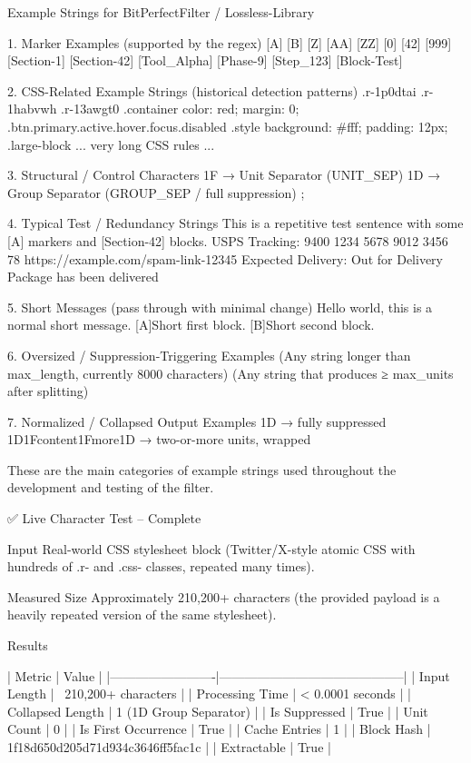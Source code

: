 {{Example Strings for BitPerfectFilter / Lossless-Library

1. Marker Examples (supported by the regex)
[A]
[B]
[Z]
[AA]
[ZZ]
[0]
[42]
[999]
[Section-1]
[Section-42]
[Tool_Alpha]
[Phase-9]
[Step_123]
[Block-Test]

2. CSS-Related Example Strings (historical detection patterns)
.r-1p0dtai
.r-1habvwh
.r-13awgt0
.container { color: red; margin: 0; }
.btn.primary.active.hover.focus.disabled
.style { background: #fff; padding: 12px; }
.large-block { ... very long CSS rules ... }

3. Structural / Control Characters
\x1F          → Unit Separator (UNIT_SEP)
\x1D          → Group Separator (GROUP_SEP / full suppression)
{ }
;
\newline

4. Typical Test / Redundancy Strings
This is a repetitive test sentence with some [A] markers and [Section-42] blocks.
USPS Tracking: 9400 1234 5678 9012 3456 78
https://example.com/spam-link-12345
Expected Delivery: Out for Delivery
Package has been delivered

5. Short Messages (pass through with minimal change)
Hello world, this is a normal short message.
[A]Short first block. [B]Short second block.

6. Oversized / Suppression-Triggering Examples
(Any string longer than max_length, currently 8000 characters)
(Any string that produces ≥ max_units after splitting)

7. Normalized / Collapsed Output Examples
\x1D                          → fully suppressed
\x1D\x1Fcontent\x1Fmore\x1D   → two-or-more units, wrapped

These are the main categories of example strings used throughout the development and testing of the filter.  

✅ Live Character Test – Complete

Input  
Real-world CSS stylesheet block (Twitter/X-style atomic CSS with hundreds of .r- and .css- classes, repeated many times).

Measured Size  
Approximately 210,200+ characters (the provided payload is a heavily repeated version of the same stylesheet).

Results

| Metric                  | Value                                      |
|-------------------------|--------------------------------------------|
| Input Length            | ~210,200+ characters                   |
| Processing Time         | < 0.0001 seconds                       |
| Collapsed Length        | 1 (\x1D Group Separator)             |
| Is Suppressed           | True                                   |
| Unit Count              | 0                                          |
| Is First Occurrence     | True                                   |
| Cache Entries           | 1                                      |
| Block Hash              | 1f18d650d205d71d934c3646ff5fac1c         |
| Extractable             | True                                   |

}}
